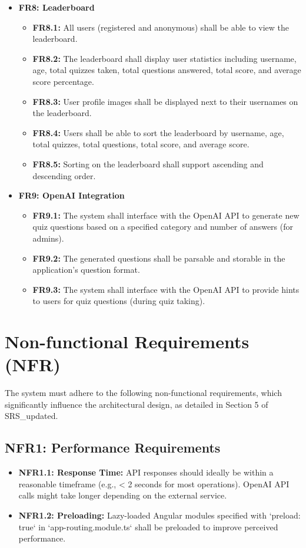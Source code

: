 \begin{itemize}
    \item \textbf{FR8: Leaderboard}
    \begin{itemize}
        \item \textbf{FR8.1:} All users (registered and anonymous) shall be able to view the leaderboard.
        \item \textbf{FR8.2:} The leaderboard shall display user statistics including username, age, total quizzes taken, total questions answered, total score, and average score percentage.
        \item \textbf{FR8.3:} User profile images shall be displayed next to their usernames on the leaderboard.
        \item \textbf{FR8.4:} Users shall be able to sort the leaderboard by username, age, total quizzes, total questions, total score, and average score.
        \item \textbf{FR8.5:} Sorting on the leaderboard shall support ascending and descending order.
    \end{itemize}

    \item \textbf{FR9: OpenAI Integration}
    \begin{itemize}
        \item \textbf{FR9.1:} The system shall interface with the OpenAI API to generate new quiz questions based on a specified category and number of answers (for admins).
        \item \textbf{FR9.2:} The generated questions shall be parsable and storable in the application's question format.
        \item \textbf{FR9.3:} The system shall interface with the OpenAI API to provide hints to users for quiz questions (during quiz taking).
    \end{itemize}
\end{itemize}

\section{Non-functional Requirements (NFR)}
\label{sec:non_functional_requirements}
The system must adhere to the following non-functional requirements, which significantly influence the architectural design, as detailed in Section 5 of SRS\_updated.

\subsection{NFR1: Performance Requirements}
\begin{itemize}
    \item \textbf{NFR1.1: Response Time:} API responses should ideally be within a reasonable timeframe (e.g., < 2 seconds for most operations). OpenAI API calls might take longer depending on the external service.
    \item \textbf{NFR1.2: Preloading:} Lazy-loaded Angular modules specified with `preload: true` in `app-routing.module.ts` shall be preloaded to improve perceived performance.
\end{itemize}

